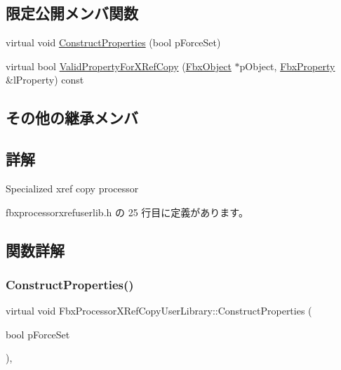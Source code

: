 \subsection*{限定公開メンバ関数}
\begin{DoxyCompactItemize}
\item 
virtual void \hyperlink{class_fbx_processor_x_ref_copy_user_library_a52eeb515bf8df31ec5d098697fe494b3}{Construct\+Properties} (bool p\+Force\+Set)
\item 
virtual bool \hyperlink{class_fbx_processor_x_ref_copy_user_library_a65545232dad661700a6c43e90530b3a6}{Valid\+Property\+For\+X\+Ref\+Copy} (\hyperlink{class_fbx_object}{Fbx\+Object} $\ast$p\+Object, \hyperlink{class_fbx_property}{Fbx\+Property} \&l\+Property) const
\end{DoxyCompactItemize}
\subsection*{その他の継承メンバ}


\subsection{詳解}
Specialized xref copy processor 

 fbxprocessorxrefuserlib.\+h の 25 行目に定義があります。



\subsection{関数詳解}
\mbox{\label{class_fbx_processor_x_ref_copy_user_library_a52eeb515bf8df31ec5d098697fe494b3}} 
\subsubsection{\texorpdfstring{Construct\+Properties()}{ConstructProperties()}}
{\footnotesize\ttfamily virtual void Fbx\+Processor\+X\+Ref\+Copy\+User\+Library\+::\+Construct\+Properties (\begin{DoxyParamCaption}\item[{bool}]{p\+Force\+Set }\end{DoxyParamCaption})\hspace{0.3cm}{\ttfamily [protected]}, {\ttfamily [virtual]}}

